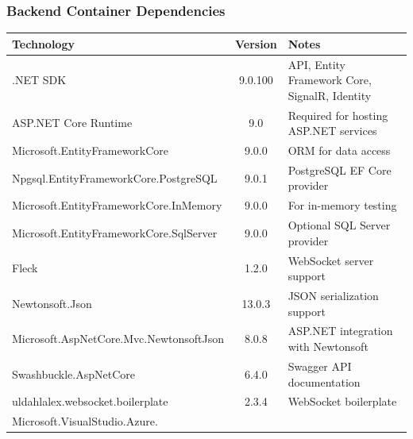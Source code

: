 \subsubsection{Backend Container Dependencies}

\begin{table}[H]
    \centering
    \footnotesize %
    \begin{tabularx}{\textwidth}{|X|c|p{}|}
        \hline
        \textbf{Technology}                     & \textbf{Version} & \textbf{Notes}                                \\
        \hline
        .NET SDK                                & 9.0.100          & API, Entity Framework Core, SignalR, Identity \\
        \hline
        ASP.NET Core Runtime                    & 9.0              & Required for hosting ASP.NET services         \\
        \hline
        Microsoft.EntityFrameworkCore           & 9.0.0            & ORM for data access                           \\
        \hline
        Npgsql.EntityFrameworkCore.PostgreSQL   & 9.0.1            & PostgreSQL EF Core provider                   \\
        \hline
        Microsoft.EntityFrameworkCore.InMemory  & 9.0.0            & For in-memory testing                         \\
        \hline
        Microsoft.EntityFrameworkCore.SqlServer & 9.0.0            & Optional SQL Server provider                  \\
        \hline
        Fleck                                   & 1.2.0            & WebSocket server support                      \\
        \hline
        Newtonsoft.Json                         & 13.0.3           & JSON serialization support                    \\
        \hline
        Microsoft.AspNetCore.Mvc.NewtonsoftJson & 8.0.8            & ASP.NET integration with Newtonsoft           \\
        \hline
        Swashbuckle.AspNetCore                  & 6.4.0            & Swagger API documentation                     \\
        \hline
        uldahlalex.websocket.boilerplate        & 2.3.4            & WebSocket boilerplate                         \\
        \hline
        Microsoft.VisualStudio.Azure.

\end{tabularx}
\end{table}
